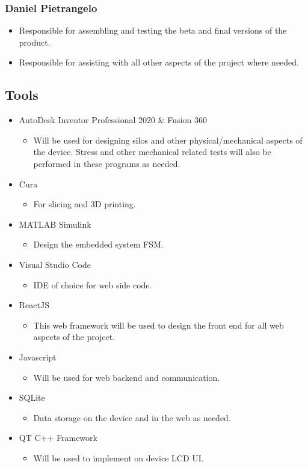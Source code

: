 \documentclass[12pt,titlepage]{article}
\begin{document}
\subsubsection{Daniel Pietrangelo}
\begin{itemize}
    \item Responsible for assembling and testing the beta and final versions of the product.
    \item Responsible for assisting with all other aspects of the project where needed.
\end{itemize}
\subsection{Tools}
\begin{itemize}
    \item AutoDesk Inventor Professional 2020 \& Fusion 360
    \begin{itemize}
        \item Will be used for designing silos and other physical/mechanical aspects of the device. Stress and other mechanical related tests will also be performed in these programs as needed.
    \end{itemize}
    \item Cura 
    \begin{itemize}
        \item For slicing and 3D printing.
    \end{itemize}
    \item MATLAB Simulink
    \begin{itemize}
        \item Design the embedded system FSM.
    \end{itemize}
   \item Visual Studio Code
    \begin{itemize}
        \item IDE of choice for web side code.
    \end{itemize}
    \item ReactJS
    \begin{itemize}
        \item This web framework will be used to design the front end for all web aspects of the project.
    \end{itemize}
    \item Javascript
    \begin{itemize}
        \item Will be used for web backend and communication.
    \end{itemize}
    \item SQLite
    \begin{itemize}
        \item Data storage on the device and in the web as needed.
    \end{itemize}
    \item QT C++ Framework
    \begin{itemize}
        \item Will be used to implement on device LCD UI.
    \end{itemize}
\end{itemize}
\end{document}
